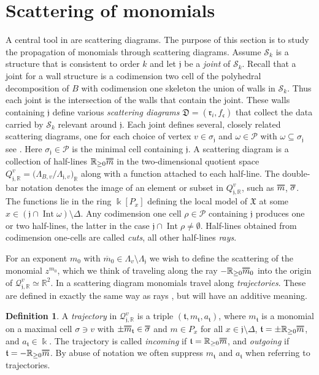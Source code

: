\documentclass[11pt,letter]{amsart}
\theoremstyle{definition}
\newtheorem{definition}[theorem]{Definition}
\theoremstyle{remark}
\numberwithin{equation}{section}
\numberwithin{figure}{section}
\newcommand{\doublebar}[1]{\shortstack{$\overline{\hphantom{#1}}
	$\\[-4pt] $\overline{#1}$}}
\newcommand{\RR} {\mathbb{R}}
\newcommand {\shQ}  {\mathcal{Q}}
\newcommand {\foc}  {\mathfrak{c}}
\newcommand {\foj}  {\mathfrak{j}}
\newcommand {\forr}  {\mathfrak{r}}
\newcommand {\fot}  {\mathfrak{t}}
\newcommand {\Int}  {\operatorname{Int}}
\newcommand {\kk} {\Bbbk}
\renewcommand{\P}  {\mathscr{P}}
\newcommand {\scrS}  {\mathscr{S}}
\newcommand {\D} {\mathfrak D}
\newcommand {\X} {\mathfrak X}
\begin{document}
\section{Scattering of monomials}
\label{sect: scattering of
monomials}
A central tool in \cite{affinecomplex} are scattering diagrams. The purpose of
this section is to study the propagation of monomials through scattering
diagrams. Assume $\scrS_k$ is a structure that is consistent to order $k$ and
let $\foj$ be a \emph{joint} of $\scrS_k$. Recall that a joint for a wall
structure is a codimension two cell of the polyhedral decomposition of $B$ with
codimension one skeleton the union of walls in $\scrS_k$. Thus each joint is the
intersection of the walls that contain the joint. These walls containing $\foj$
define various \emph{scattering diagrams} $\D=(\forr_i, f_\foc)$ that collect
the data carried by $\scrS_k$ relevant around $\foj$. Each joint defines
several, closely related scattering diagrams, one for each choice of vertex
$v\in\sigma_\foj$ and $\omega\in\P$ with $\omega\subseteq \sigma_\foj$ see
\cite[Def.\,3.3, Constr.\,3.4]{affinecomplex}. Here $\sigma_\foj\in\P$ is
the minimal cell containing $\foj$. A scattering diagram is a collection of
half-lines $\RR_{\ge0}\doublebar m$ in the two-dimensional quotient space
$Q_{\foj,\RR}^v=\big(\Lambda_{B,v}/ \Lambda_{\foj,v}\big)_\RR$ along with a
function attached to each half-line. The double-bar notation denotes the image
of an element or subset in $Q_{\foj,\RR}^v$, such as $\doublebar m$,
$\doublebar\sigma$. The functions lie in the ring $\kk[P_x]$ defining the local
model of $\X$ at some $x\in (\foj\cap \Int \omega)\setminus\Delta$. Any
codimension one cell $\rho\in\P$ containing $\foj$ produces one or two
half-lines, the latter in the case $\foj\cap\Int\rho\neq\emptyset$. Half-lines
obtained from codimension one-cells are called \emph{cuts}, all other
half-lines \emph{rays}.

For an exponent $m_0$ with $\overline m_0\in\Lambda_v\setminus \Lambda_\foj$ we
wish to define the scattering of the monomial $z^{m_0}$, which we think of
traveling along the ray $-\RR_{\ge0} \doublebar m_0$ into the origin of
$\shQ_{\foj,\RR}^v\simeq\RR^2$. In a scattering diagram monomials travel along
\emph{trajectories}. These are defined in exactly the same way as rays
\cite[Def.\,3.3]{affinecomplex}, but will have an additive meaning.

\begin{definition}
A \emph{trajectory} in $\shQ_{\foj,\RR}^v$ is a triple $(\fot,m_\fot, a_\fot)$,
where $m_\fot$ is a monomial on a maximal cell $\sigma\ni v$ with $\pm
\doublebar m_\fot\in \doublebar \sigma$ and $m\in P_x$ for all $x\in
\foj\setminus\Delta$, $\fot=\pm \RR_{\ge 0} \doublebar m$, and $a_\fot\in \kk$.
The trajectory is called \emph{incoming} if $\fot=\RR_{\ge 0} \doublebar m$, and
\emph{outgoing} if $\fot=-\RR_{\ge 0} \doublebar m$. By abuse of notation we
often suppress $m_\fot$ and $a_\fot$ when referring to trajectories.
\end{definition}
\end{document}
